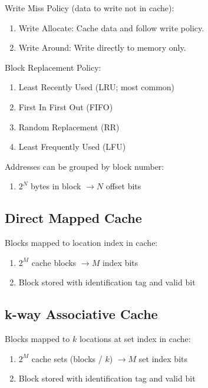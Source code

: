 \documentclass[12pt, a4paper]{article}
\begin{document}
\begin{multicols*}{3}
Write Miss Policy (data to write not in cache):
\begin{enumerate}[\roman*.]
  \item Write Allocate: Cache data and follow write policy. 
  \item Write Around: Write directly to memory only.
\end{enumerate}

Block Replacement Policy:
\begin{enumerate}[\roman*.]
  \item Least Recently Used (LRU; most common)
  \item First In First Out (FIFO)
  \item Random Replacement (RR)
  \item Least Frequently Used (LFU)
\end{enumerate}

Addresses can be grouped by block number:
\begin{enumerate}[\roman*.]
  \item $2^N$ bytes in block $\rightarrow N$ offset bits
\end{enumerate}
{\centering{}\par}

\subsection{Direct Mapped Cache}
Blocks mapped to location index in cache:
\begin{enumerate}[\roman*.]
  \item $2^M$ cache blocks $\rightarrow M$ index bits
  \item Block stored with identification tag and valid bit
\end{enumerate}
{\centering{}\par}

\subsection{k-way Associative Cache}
Blocks mapped to $k$ locations at set index in cache: 
\begin{enumerate}[\roman*.]
  \item $2^M$ cache sets (blocks / $k$) $\rightarrow M$ set index bits
  \item Block stored with identification tag and valid bit 
\end{enumerate}
{\centering{}\par}


\end{multicols*}
\end{document}
